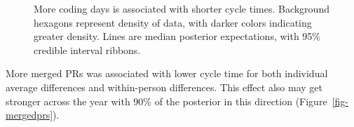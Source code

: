 \documentclass[manuscript,screen,review]{acmart}
\begin{document}
\begin{figure}


\caption[More coding days is associated with shorter cycle
times]{\label{fig-codingdays}More coding days is associated with shorter
cycle times. Background hexagons represent density of data, with darker
colors indicating greater density. Lines are median posterior
expectations, with 95\% credible interval ribbons.}

\end{figure}%

More merged PRs was associated with lower cycle time for both individual
average differences and within-person differences. This effect also may
get stronger across the year with 90\% of the posterior in this
direction (Figure~\ref{fig-mergedprs}).
\end{document}
